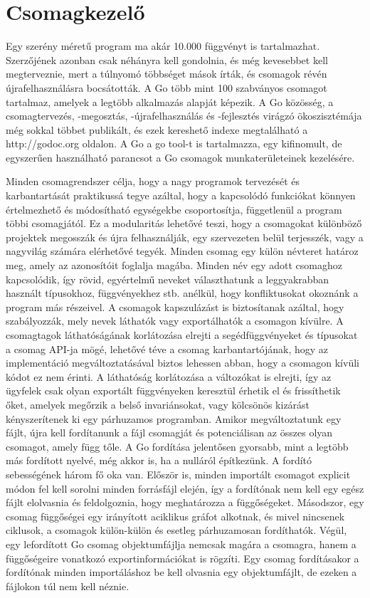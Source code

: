 \section{Csomagkezelő}
Egy szerény méretű program ma akár 10.000 függvényt is tartalmazhat. Szerzőjének azonban csak néhányra kell gondolnia, és még kevesebbet kell megterveznie, mert a túlnyomó többséget mások írták, és csomagok révén újrafelhasználásra bocsátották. A Go több mint 100 szabványos csomagot tartalmaz, amelyek a legtöbb alkalmazás alapját képezik. A Go közösség, a csomagtervezés, -megosztás, -újrafelhasználás és -fejlesztés virágzó ökoszisztémája még sokkal többet publikált, és ezek kereshető indexe megtalálható a http://godoc.org oldalon. A Go a go tool-t is tartalmazza, egy kifinomult, de egyszerűen használható parancsot a Go csomagok munkaterületeinek kezelésére.

Minden csomagrendszer célja, hogy a nagy programok tervezését és karbantartását praktikussá tegye azáltal, hogy a kapcsolódó funkciókat könnyen értelmezhető és módosítható egységekbe csoportosítja, függetlenül a program többi csomagjától. Ez a modularitás lehetővé teszi, hogy a csomagokat különböző projektek megosszák és újra felhasználják, egy szervezeten belül terjesszék, vagy a nagyvilág számára elérhetővé tegyék. Minden csomag egy külön névteret határoz meg, amely az azonosítóit foglalja magába. Minden név egy adott csomaghoz kapcsolódik, így rövid, egyértelmű neveket választhatunk a leggyakrabban használt típusokhoz, függvényekhez stb. anélkül, hogy konfliktusokat okoznánk a program más részeivel.
A csomagok kapszulázást is biztosítanak azáltal, hogy szabályozzák, mely nevek láthatók vagy exportálhatók a csomagon kívülre. A csomagtagok láthatóságának korlátozása elrejti a segédfüggvényeket és típusokat a csomag API-ja mögé, lehetővé téve a csomag karbantartójának, hogy az implementáció megváltoztatásával biztos lehessen abban, hogy a csomagon kívüli kódot ez nem érinti. A láthatóság korlátozása a változókat is elrejti, így az ügyfelek csak olyan exportált függvényeken keresztül érhetik el és frissíthetik őket, amelyek megőrzik a belső invariánsokat, vagy kölcsönös kizárást kényszerítenek ki egy párhuzamos programban. Amikor megváltoztatunk egy fájlt, újra kell fordítanunk a fájl csomagját és potenciálisan az összes olyan csomagot, amely függ tőle. A Go fordítása jelentősen gyorsabb, mint a legtöbb más fordított nyelvé, még akkor is, ha a nulláról építkezünk. A fordító sebességének három fő oka van. Először is, minden importált csomagot explicit módon fel kell sorolni minden forrásfájl elején, így a fordítónak nem kell egy egész fájlt elolvasnia és feldolgoznia, hogy meghatározza a függőségeket. Másodszor, egy csomag függőségei egy irányított aciklikus gráfot alkotnak, és mivel nincsenek ciklusok, a csomagok külön-külön és esetleg párhuzamosan fordíthatók. Végül, egy lefordított Go csomag objektumfájlja nemcsak magára a csomagra, hanem a függőségeire vonatkozó exportinformációkat is rögzíti. Egy csomag fordításakor a fordítónak minden importáláshoz be kell olvasnia egy objektumfájlt, de ezeken a fájlokon túl nem kell néznie.
\cite{Alan15}

